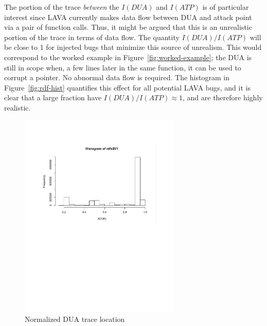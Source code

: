 The portion of the trace \emph{between} the $I(DUA)$ and $I(ATP)$ is of particular interest since LAVA currently makes data flow between DUA and attack point via a pair of function calls.
Thus, it might be argued that this is an unrealistic portion of the trace in terms of data flow.
The quantity $I(DUA)/I(ATP)$ will be close to 1 for injected bugs that minimize this source of unrealism.
This would correspond to the worked example in Figure~\ref{fig:worked-example}; the DUA is still in scope when, a few lines later in the same function, it can be used to corrupt a pointer.
No abnormal data flow is required.
The histogram in Figure~\ref{fig:rdf-hist} quantifies this effect for all potential LAVA bugs, and it is clear that a large fraction have $I(DUA)/I(ATP) \approx 1$, and are therefore highly realistic.


\begin{figure}
\centering
\includegraphics[width=3in]{dua.pdf}
\caption{Normalized DUA trace location}
\label{fig:dua-hist}
\end{figure}

